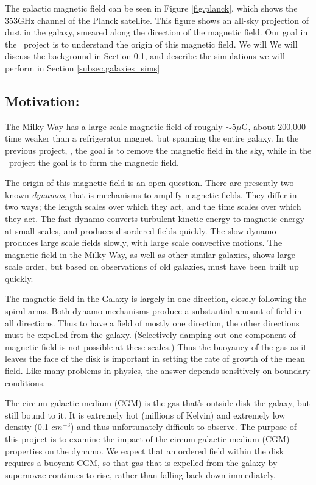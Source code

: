 The galactic magnetic field can be seen in Figure \ref{fig.planck}, which shows
the 353GHz channel of the Planck satellite.  This figure
shows an all-sky projection of dust in the galaxy, smeared along the direction of
the magnetic field.  Our goal in the \nameGalaxies\ project is to understand the
origin of this magnetic field.   We will We will discuss the background in Section
\ref{subsec.galaxies_motivate}, and describe the simulations we will perform in
Section \ref{subsec.galaxies_sims}

\subsection{Motivation: \nameGalaxies}
\label{subsec.galaxies_motivate}

The Milky Way has a large scale magnetic
field of roughly $\sim 5 \mu$G, about 200,000 time weaker than a refrigerator
magnet, but spanning the entire galaxy.   In the previous project, \nameCMB, the
goal is to remove the magnetic field in the sky, while in
the \nameGalaxies\ project the goal is to form the magnetic field.

The origin of this magnetic field is an open question.  There are presently two
known \emph{dynamos}, that is mechanisms to amplify magnetic fields. They differ in
two ways; the length scales over which they act, and the time scales over which
they act.  The fast
dynamo converts turbulent kinetic energy to magnetic energy at small scales, and
produces disordered fields quickly.  The slow dynamo produces large scale fields
slowly, with large scale convective motions. The magnetic field in the Milky Way, as well as other similar galaxies,
shows large scale order, but based on observations of old galaxies, must have been
built up quickly. 

The magnetic field in the Galaxy is largely in one direction, closely following
the spiral arms.  Both
dynamo mechanisms produce a
substantial amount of field in all directions.  Thus to have a field of mostly
one direction, the other directions must be expelled from the galaxy.
(Selectively damping out one component of magnetic field is not possible at
these scales.)
Thus the buoyancy of the gas as
it leaves the face of the disk is important in setting the rate of growth of
the mean field.  Like many problems in physics, the answer depends sensitively
on boundary conditions.

The circum-galactic medium (CGM) is the gas that's outside disk the galaxy, but still
bound to it.  It is extremely hot (millions of Kelvin) and extremely low density
(0.1 $cm^{-3}$) and thus unfortunately difficult to observe.
The purpose of this project is to examine the impact of the circum-galactic
medium (CGM) properties on the dynamo. We expect that an ordered field within
the disk requires a buoyant CGM, so that gas that is expelled from the galaxy by
supernovae continues to rise, rather than falling back down immediately.  

